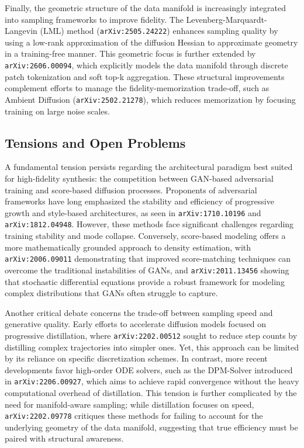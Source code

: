 \documentclass[11pt]{article}
\begin{document}
Finally, the geometric structure of the data manifold is increasingly integrated into sampling frameworks to improve fidelity. The Levenberg-Marquardt-Langevin (LML) method (\texttt{arXiv:2505.24222}) enhances sampling quality by using a low-rank approximation of the diffusion Hessian to approximate geometry in a training-free manner. This geometric focus is further extended by \texttt{arXiv:2606.00094}, which explicitly models the data manifold through discrete patch tokenization and soft top-k aggregation. These structural improvements complement efforts to manage the fidelity-memorization trade-off, such as Ambient Diffusion (\texttt{arXiv:2502.21278}), which reduces memorization by focusing training on large noise scales.

\subsection{Tensions and Open Problems}

A fundamental tension persists regarding the architectural paradigm best suited for high-fidelity synthesis: the competition between GAN-based adversarial training and score-based diffusion processes. Proponents of adversarial frameworks have long emphasized the stability and efficiency of progressive growth and style-based architectures, as seen in \texttt{arXiv:1710.10196} and \texttt{arXiv:1812.04948}. However, these methods face significant challenges regarding training stability and mode collapse. Conversely, score-based modeling offers a more mathematically grounded approach to density estimation, with \texttt{arXiv:2006.09011} demonstrating that improved score-matching techniques can overcome the traditional instabilities of GANs, and \texttt{arXiv:2011.13456} showing that stochastic differential equations provide a robust framework for modeling complex distributions that GANs often struggle to capture.

Another critical debate concerns the trade-off between sampling speed and generative quality. Early efforts to accelerate diffusion models focused on progressive distillation, where \texttt{arXiv:2202.00512} sought to reduce step counts by distilling complex trajectories into simpler ones. Yet, this approach can be limited by its reliance on specific discretization schemes. In contrast, more recent developments favor high-order ODE solvers, such as the DPM-Solver introduced in \texttt{arXiv:2206.00927}, which aims to achieve rapid convergence without the heavy computational overhead of distillation. This tension is further complicated by the need for manifold-aware sampling; while distillation focuses on speed, \texttt{arXiv:2202.09778} critiques these methods for failing to account for the underlying geometry of the data manifold, suggesting that true efficiency must be paired with structural awareness.
\end{document}
